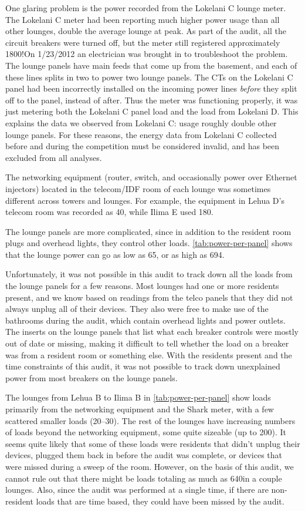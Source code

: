 \label{par:lokelani-c}
One glaring problem is the power recorded from the Lokelani C lounge meter. The Lokelani C meter had been reporting much higher power usage than all other lounges, double the average lounge at peak. As part of the audit, all the circuit breakers were turned off, but the meter still registered approximately 1800\W!\@ On 1/23/2012 an electrician was brought in to troubleshoot the problem. The lounge panels have main feeds that come up from the basement, and each of these lines splits in two to power two lounge panels. The CTs on the Lokelani C panel had been incorrectly installed on the incoming power lines \emph{before} they split off to the panel, instead of after. Thus the meter was functioning properly, it was just metering both the Lokelani C panel load and the load from Lokelani D. This explains the data we observed from Lokelani C: usage roughly double other lounge panels. For these reasons, the energy data from Lokelani C collected before and during the competition must be considered invalid, and has been excluded from all analyses.

The networking equipment (router, switch, and occasionally power over Ethernet injectors) located in the telecom/IDF room of each lounge was sometimes different across towers and lounges. For example, the equipment in Lehua D's telecom room was recorded as 40\W, while Ilima E used 180\W.

The lounge panels are more complicated, since in addition to the resident room plugs and overhead lights, they control other loads. \autoref{tab:power-per-panel} shows that the lounge power can go as low as 65\W, or as high as 694\W.

Unfortunately, it was not possible in this audit to track down all the loads from the lounge panels for a few reasons. Most lounges had one or more residents present, and we know based on readings from the telco panels that they did not always unplug all of their devices. They also were free to make use of the bathrooms during the audit, which contain overhead lights and power outlets. The inserts on the lounge panels that list what each breaker controls were mostly out of date or missing, making it difficult to tell whether the load on a breaker was from a resident room or something else. With the residents present and the time constraints of this audit, it was not possible to track down unexplained power from most breakers on the lounge panels.

The lounges from Lehua B to Ilima B in \autoref{tab:power-per-panel} show loads primarily from the networking equipment and the Shark meter, with a few scattered smaller loads (20--30\W). The rest of the lounges have increasing numbers of loads beyond the networking equipment, some quite sizeable (up to 200\W). It seems quite likely that some of these loads were residents that didn't unplug their devices, plugged them back in before the audit was complete, or devices that were missed during a sweep of the room. However, on the basis of this audit, we cannot rule out that there might be loads totaling as much as 640\W in a couple lounges. Also, since the audit was performed at a single time, if there are non-resident loads that are time based, they could have been missed by the audit.

